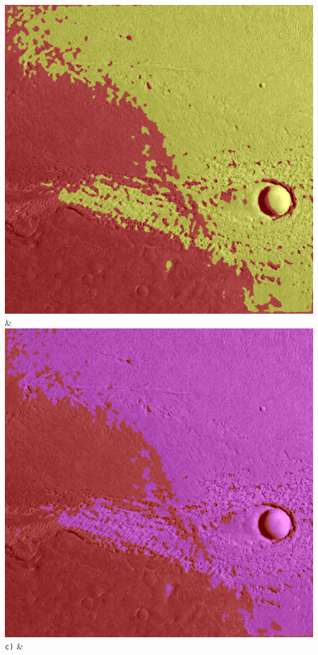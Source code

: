 \begin{table}[h!]
\begin{tabularx}{\textwidth}
		\includegraphics[width=0.9\linewidth]{images/gen/activation_functions/p03_02.png_sigmoid.png} &
		\includegraphics[width=0.9\linewidth]{images/gen/activation_functions/p03_02.png_tanh.png} \\
		\texttt{c)} &

\end{tabularx}
\end{table}
